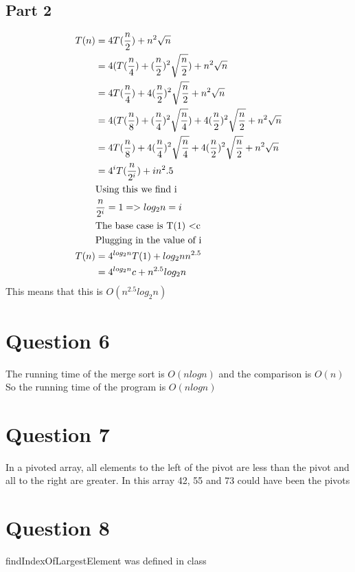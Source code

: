 \documentclass{article}
\begin{document}
    \subsection{Part 2}
        \begin{align*}
            T(n) &= 4T(\frac{n}{2}) + n^2\sqrt{n}\\
            &= 4(T(\frac{n}{4}) + (\frac{n}{2})^2 \sqrt{\frac{n}{2}}) + n^2\sqrt{n}\\
            &= 4T(\frac{n}{4}) + 4(\frac{n}{2})^2 \sqrt{\frac{n}{2}} + n^2\sqrt{n}\\
            &= 4(T(\frac{n}{8}) + (\frac{n}{4})^2 \sqrt{\frac{n}{4}}) + 4(\frac{n}{2})^2 \sqrt{\frac{n}{2}} + n^2\sqrt{n}\\
            &= 4T(\frac{n}{8}) + 4(\frac{n}{4})^2 \sqrt{\frac{n}{4}} + 4(\frac{n}{2})^2 \sqrt{\frac{n}{2}} + n^2\sqrt{n}\\
            &= 4^i T(\frac{n}{2^i}) + in^2.5\\
            &\textrm{Using this we find i}\\
            &\frac{n}{2^i} = 1 => log_2 n = i\\
            &\textrm{The base case is T(1) \textless c}\\
            &\textrm{Plugging in the value of i}\\
            T(n) &= 4^{log_2 n}T(1) + log_2 nn^{2.5}\\
            &= 4^{log_2 n}c + n^{2.5}log_2 n\\
        \end{align*}
        This means that this is $O(n^{2.5}log_2 n)$

\section{Question 6}
    

    The running time of the merge sort is $O(nlogn)$ and the comparison is $O(n)$
    So the running time of the program is $O(nlogn)$
\\
\section{Question 7}
    In a pivoted array, all elements to the left of the pivot are less than the pivot and all to the right are greater.
    In this array 42, 55 and 73 could have been the pivots
\newpage
\section{Question 8}
    findIndexOfLargestElement was defined in class
\end{document}
